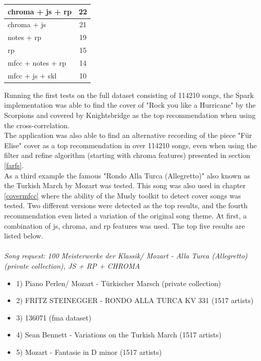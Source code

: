 \begin{table}[H]
\begin{minipage}{0.5\textwidth}
\begin{center}
\begin{tabular}{|l||c|}
				\hline
				chroma + js + rp & 22\\
				\hline
				chroma + js & 21\\
				\hline
				notes + rp & 19\\
				\hline
				rp & 15\\
				\hline
				mfcc + notes + rp & 14\\
				\hline
				mfcc + js + skl & 10\\
				\hline
			\end{tabular}
		\end{center}
	\end{minipage}
\end{table}

\noindent Running the first tests on the full dataset consisting of 114210 songs, the Spark implementation was able to find the cover of "Rock you like a Hurricane" by the Scorpions and covered by Knightsbridge as the top recommendation when using the cross-correlation.\\
\noindent The application was also able to find an alternative recording of the piece "Für Elise" cover as a top recommendation in over 114210 songs, even when using the filter and refine algorithm (starting with chroma features) presented in section \ref{farfs}.\\
\noindent As a third example the famous "Rondo Alla Turca (Allegretto)" also known as the Turkish March by Mozart was tested. This song was also used in chapter \ref{covermfcc} where the ability of the Musly toolkit to detect cover songs was tested. \noindent Two different versions were detected as the top results, and the fourth recommendation even listed a variation of the original song theme. 
At first, a combination of js, chroma, and rp features was used. The top five results are listed below.\\
\ \\
\textit{\noindent Song request: 100 Meisterwerke der Klassik/ Mozart - Alla Turca (Allegretto) (private collection), JS + RP + CHROMA}

\begin{itemize}
	\setlength\itemsep{-0.5em}
	\item 1) Piano Perlen/ Mozart - Türkischer Marsch (private collection)
	\item 2) FRITZ STEINEGGER - RONDO ALLA TURCA KV 331 (1517 artists)
	\item 3) 136071 (fma dataset)
	\item 4) Sean Bennett - Variations on the Turkish March (1517 artists)
	\item 5) Mozart - Fantasie in D minor (1517 artists)
\end{itemize}

